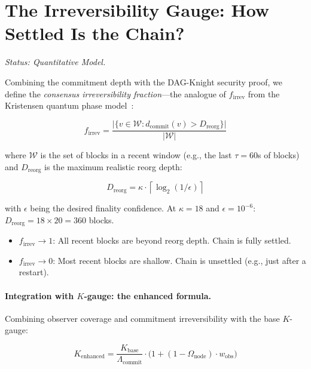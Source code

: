 \documentclass[11pt,a4paper]{article}
\begin{document}
\section{The Irreversibility Gauge: How Settled Is the Chain?}
\label{sec:firrev}

\emph{Status: \textcolor{hardcoded}{Quantitative Model}.}

Combining the commitment depth with the DAG-Knight security proof, we define the \emph{consensus irreversibility fraction}---the analogue of $f_{\text{irrev}}$ from the Kristensen quantum phase model~\cite{kristensen2026}:

\begin{equation}
f_{\text{irrev}} = \frac{\bigl|\{v \in \mathcal{W} : d_{\text{commit}}(v) > D_{\text{reorg}}\}\bigr|}{|\mathcal{W}|}
\label{eq:firrev}
\end{equation}

where $\mathcal{W}$ is the set of blocks in a recent window (e.g., the last $\tau = 60$s of blocks) and $D_{\text{reorg}}$ is the maximum realistic reorg depth:

\begin{equation}
D_{\text{reorg}} = \kappa \cdot \left\lceil \log_2(1/\epsilon) \right\rceil
\end{equation}

with $\epsilon$ being the desired finality confidence. At $\kappa = 18$ and $\epsilon = 10^{-6}$: $D_{\text{reorg}} = 18 \times 20 = 360$ blocks.

\begin{itemize}[nosep]
    \item $f_{\text{irrev}} \to 1$: All recent blocks are beyond reorg depth. Chain is fully settled.
    \item $f_{\text{irrev}} \to 0$: Most recent blocks are shallow. Chain is unsettled (e.g., just after a restart).
\end{itemize}

\paragraph{Integration with $K$-gauge: the enhanced formula.} Combining observer coverage and commitment irreversibility with the base $K$-gauge:

\begin{equation}
\boxed{K_{\text{enhanced}} = \frac{K_{\text{base}}}{\Lambda_{\text{commit}}} \cdot \bigl(1 + (1 - \Omega_{\text{node}}) \cdot w_{\text{obs}}\bigr)}
\label{eq:kenhanced}
\end{equation}
\end{document}
